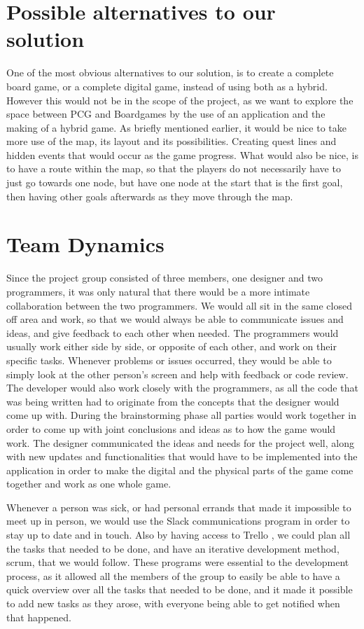 \section{Possible alternatives to our solution}
One of the most obvious alternatives to our solution, is to create a complete board game, or a complete digital game, instead of using both as a hybrid. However this would not be in the scope of the project, as we want to explore the space between PCG and Boardgames by the use of an application and the making of a hybrid game.
As briefly mentioned earlier, it would be nice to take more use of the map, its layout and its possibilities. Creating quest lines and hidden events that would occur as the game progress. What would also be nice, is to have a route within the map, so that the players do not necessarily have to just go towards one node, but have one node at the start that is the first goal, then having other goals afterwards as they move through the map. 

\section{Team Dynamics}
Since the project group consisted of three members, one designer and two programmers, it was only natural that there would be a more intimate collaboration between the two programmers. We would all sit in the same closed off area and work, so that we would always be able to communicate issues and ideas, and give feedback to each other when needed. The programmers would usually work either side by side, or opposite of each other, and work on their specific tasks. Whenever problems or issues occurred, they would be able to simply look at the other person's screen and help with feedback or code review. The developer would also work closely with the programmers, as all the code that was being written had to originate from the concepts that the designer would come up with. During the brainstorming phase all parties would work together in order to come up with joint conclusions and ideas as to how the game would work. The designer communicated the ideas and needs for the project well, along with new updates and functionalities that would have to be implemented into the application in order to make the digital and the physical parts of the game come together and work as one whole game. 

Whenever a person was sick, or had personal errands that made it impossible to meet up in person, we would use the Slack \cite{prog:slack} communications program in order to stay up to date and in touch. Also by having access to Trello \cite{prog:trello}, we could plan all the tasks that needed to be done, and have an iterative development method, scrum, that we would follow. These programs were essential to the development process, as it allowed all the members of the group to easily be able to have a quick overview over all the tasks that needed to be done, and it made it possible to add new tasks as they arose, with everyone being able to get notified when that happened.

